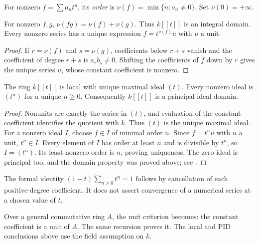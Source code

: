 \begin{definition}\label{series-order}
For nonzero $f=\sum a_nt^n$, its \emph{order} is
$\nu(f)=\min\{n:a_n\ne0\}$. Set $\nu(0)=+\infty$.
\end{definition}
\begin{proposition}\label{series-order-properties}
For nonzero $f,g$, $\nu(fg)=\nu(f)+\nu(g)$. Thus $k[[t]]$ is an
integral domain. Every nonzero series has a unique expression
$f=t^{\nu(f)}u$ with $u$ a unit.
\end{proposition}
\begin{proof}\label{series-order-properties-proof}
If $r=\nu(f)$ and $s=\nu(g)$, coefficients below $r+s$ vanish and
the coefficient of degree $r+s$ is $a_rb_s\ne0$.
Shifting the coefficients of $f$ down by $r$ gives the unique series
$u$, whose constant coefficient is nonzero.
\end{proof}

\begin{theorem}\label{series-ideals}
The ring $k[[t]]$ is local with unique maximal ideal $(t)$.
Every nonzero ideal is $(t^n)$ for a unique $n\ge0$.
Consequently $k[[t]]$ is a principal ideal domain.
\end{theorem}
\begin{proof}\label{series-ideals-proof}
Nonunits are exactly the series in $(t)$, and evaluation of the constant
coefficient identifies the quotient with $k$. Thus $(t)$ is the unique
maximal ideal. For a nonzero ideal $I$, choose $f\in I$ of minimal
order $n$. Since $f=t^nu$ with $u$ a unit, $t^n\in I$.
Every element of $I$ has order at least $n$ and is divisible by $t^n$,
so $I=(t^n)$. Its least nonzero order is $n$, proving uniqueness.
The zero ideal is principal too, and the domain property was proved above;
see .
\end{proof}
\begin{example}\label{geometric-series}
The formal identity $(1-t)\sum_{n\ge0}t^n=1$ follows by cancellation
of each positive-degree coefficient. It does not assert convergence
of a numerical series at a chosen value of $t$.
\end{example}
\begin{remark}\label{series-coefficient-scope}
Over a general commutative ring $A$, the unit criterion becomes: the
constant coefficient is a unit of $A$. The same recursion proves it.
The local and PID conclusions above use the field assumption on $k$.
\end{remark}
